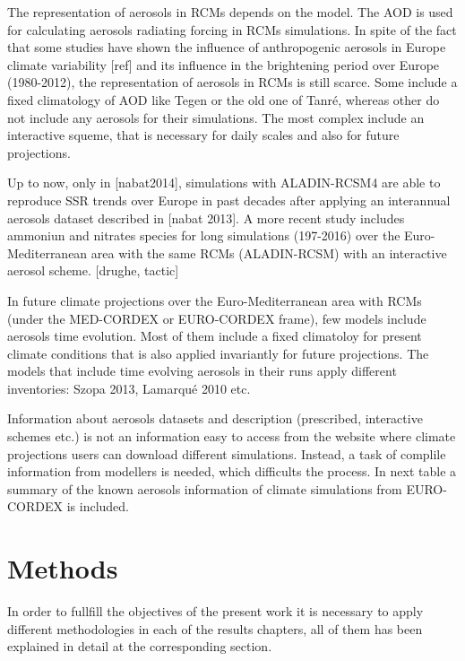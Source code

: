 The representation of aerosols in RCMs depends on the model. The AOD is used for calculating aerosols radiating forcing in RCMs simulations. In spite of the fact that some studies have shown the influence of anthropogenic aerosols in Europe climate variability [ref] and its influence in the brightening period over Europe (1980-2012), the representation of aerosols in RCMs is still scarce. Some include a fixed climatology of AOD like Tegen or the old one of Tanré, whereas other do not include any aerosols for their simulations. The most complex include an interactive squeme, that is necessary for daily scales and also for future projections.

Up to now, only in [nabat2014], simulations with ALADIN-RCSM4 are able to reproduce SSR trends over Europe in past decades after applying an interannual aerosols dataset described in [nabat 2013]. A more recent study includes ammoniun and nitrates species for long simulations (197-2016) over the Euro-Mediterranean area with the same RCMs (ALADIN-RCSM) with an interactive aerosol scheme. [drughe, tactic]

In future climate projections over the Euro-Mediterranean area with RCMs (under the MED-CORDEX or EURO-CORDEX frame), few models include aerosols time evolution. Most of them include a fixed climatoloy for present climate conditions that is also applied invariantly for future projections. The models that include time evolving aerosols in their runs apply different inventories: Szopa 2013, Lamarqué 2010 etc.

Information about aerosols datasets and description (prescribed, interactive schemes etc.) is not an information easy to access from the website where climate projections users can download different simulations. Instead, a task of complile information from modellers is needed, which difficults the process. In next table a summary of the known aerosols information of climate simulations from EURO-CORDEX is included.


\chapter{Methods\label{cha:methods}}

In order to fullfill the objectives of the present work it is necessary to apply different methodologies in each of the results chapters, all of them has been explained in detail at the corresponding section. %


